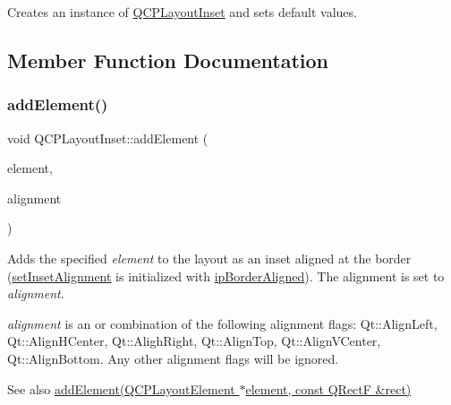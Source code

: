 Creates an instance of \hyperlink{classQCPLayoutInset}{Q\+C\+P\+Layout\+Inset} and sets default values. 

\subsection{Member Function Documentation}
\mbox{\label{classQCPLayoutInset_ad61529eb576af7f04dff94abb10c745a}} 
\subsubsection{\texorpdfstring{add\+Element()}{addElement()}\hspace{0.1cm}{\footnotesize\ttfamily [1/2]}}
{\footnotesize\ttfamily void Q\+C\+P\+Layout\+Inset\+::add\+Element (\begin{DoxyParamCaption}\item[{\hyperlink{classQCPLayoutElement}{Q\+C\+P\+Layout\+Element} $\ast$}]{element,  }\item[{Qt\+::\+Alignment}]{alignment }\end{DoxyParamCaption})}

Adds the specified {\itshape element} to the layout as an inset aligned at the border (\hyperlink{classQCPLayoutInset_a62882a4f9ad58bb0f53da12fde022abe}{set\+Inset\+Alignment} is initialized with \hyperlink{classQCPLayoutInset_a8b9e17d9a2768293d2a7d72f5e298192aa81e7df4a785ddee2229a8f47c46e817}{ip\+Border\+Aligned}). The alignment is set to {\itshape alignment}.

{\itshape alignment} is an or combination of the following alignment flags\+: Qt\+::\+Align\+Left, Qt\+::\+Align\+H\+Center, Qt\+::\+Aligh\+Right, Qt\+::\+Align\+Top, Qt\+::\+Align\+V\+Center, Qt\+::\+Align\+Bottom. Any other alignment flags will be ignored.

\begin{DoxySeeAlso}{See also}
\hyperlink{classQCPLayoutInset_a8ff61fbee4a1f0ff45c398009d9f1e56}{add\+Element(\+Q\+C\+P\+Layout\+Element $\ast$element, const Q\+Rect\+F \&rect)} 
\end{DoxySeeAlso}
\mbox{\label{classQCPLayoutInset_a8ff61fbee4a1f0ff45c398009d9f1e56}} 
